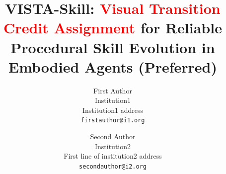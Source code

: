 \documentclass[10pt,twocolumn,letterpaper]{article}
\title{VISTA-Skill: \textcolor{red}{Visual Transition Credit Assignment} for Reliable Procedural Skill Evolution in Embodied Agents (Preferred)}
\author{First Author\\
Institution1\\
Institution1 address\\
{\tt\small firstauthor@i1.org}
\and
Second Author\\
Institution2\\
First line of institution2 address\\
{\tt\small secondauthor@i2.org}
}
\begin{document}
\maketitle
    





{
    \small
    
    
}

\newpage



\end{document}
